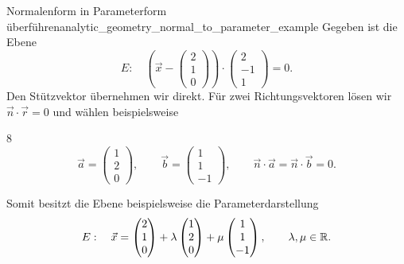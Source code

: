 \begin{ExampleBox}{Normalenform in Parameterform überführen}{analytic_geometry_normal_to_parameter_example}
    Gegeben ist die Ebene
    \[
      E:\quad
      \left(\vec x-\begin{pmatrix}2\\1\\0\end{pmatrix}\right)
        \cdot\begin{pmatrix}2\\-1\\1\end{pmatrix}=0.
    \]
    Den Stützvektor übernehmen wir direkt. Für zwei Richtungsvektoren lösen
    wir $\vec n\cdot\vec r=0$ und wählen beispielsweise
    \begin{ClozeArea}[34]{8}
      \[
        \vec a=\begin{pmatrix}1\\2\\0\end{pmatrix},
        \qquad
        \vec b=\begin{pmatrix}1\\1\\-1\end{pmatrix},
        \qquad
        \vec n\cdot\vec a=\vec n\cdot\vec b=0.
      \]
    \end{ClozeArea}
    Somit besitzt die Ebene beispielsweise die Parameterdarstellung
    \[
      E:\quad
      \vec x=\begin{pmatrix}2\\1\\0\end{pmatrix}
        +\lambda\begin{pmatrix}1\\2\\0\end{pmatrix}
        +\mu\begin{pmatrix}1\\1\\-1\end{pmatrix},
      \qquad \lambda,\mu\in\mathbb{R}.
    \]
\end{ExampleBox}
